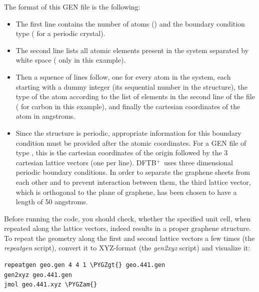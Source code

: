 \documentclass[a4paper,11pt,english]{sphinxmanual}
\newcommand{\dftbp}{\textsf{DFTB$^{\text{+}}$\ }} %
\def\PYGZam{\char`\&}
\def\PYGZgt{\char`\>}
\begin{document}
{{The format of this GEN file is the following:
\begin{itemize}
\item {} 
The first line contains the number of atoms () and the boundary
condition type ( for a periodic crystal).

\item {} 
The second line lists all atomic elements present in the system
separated by white space ( only in this example).

\item {} 
Then a squence of lines follow, one for every atom in the system,
each starting with a dummy integer (its sequential number in the
structure), the type of the atom according to the list of elements
in the second line of the file ( for carbon in this example),
and finally the cartesian coordinates of the atom in angstroms.

\item {} 
Since the structure is periodic, appropriate information for this
boundary condition must be provided after the atomic
coordinates. For a GEN file of type , this is the cartesian
coordinates of the origin followed by the 3 cartesian lattice
vectors (one per line). \dftbp uses three dimensional periodic
boundary conditions. In order to separate the graphene sheets from
each other and to prevent interaction between them, the third
lattice vector, which is orthogonal to the plane of graphene, has
been chosen to have a length of 50 angstroms.

\end{itemize}

Before running the code, you should check, whether the specified unit
cell, when repeated along the lattice vectors, indeed results in a
proper graphene structure. To repeat the geometry along the first and
second lattice vectors a few times (the \emph{repeatgen} script), convert
it to XYZ-format (the \emph{gen2xyz} script) and visualize it:

\begin{Verbatim}[commandchars=\\\{\}]
repeatgen geo.gen 4 4 1 \PYGZgt{} geo.441.gen
gen2xyz geo.441.gen
jmol geo.441.xyz \PYGZam{}
\end{Verbatim}

}}
\end{document}
